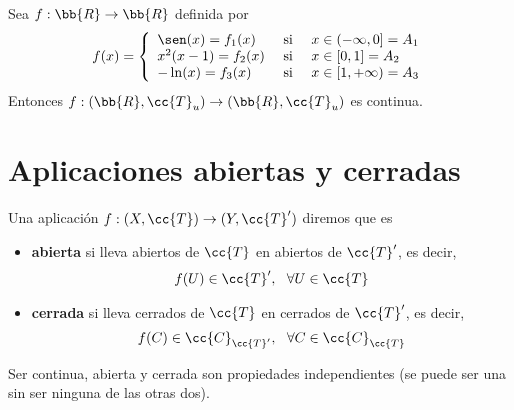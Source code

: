 \begin{ejemplo}
    Sea $f:\bb{R} \to \bb{R}$ definida por
    \begin{gather*}
        f(x)=\left\{
        \begin{array}{lcl}
            \sen(x)=f_1(x) & \text{ si } & x \in (-\infty, 0] = A_1\\
            x^2(x-1)=f_2(x) & \text{ si } & x \in [0,1] = A_2\\
            -\ln(x) = f_3(x) & \text{ si } & x \in [1, +\infty) = A_3\\
        \end{array}
        \right.
    \end{gather*}
    Entonces $f:(\bb{R}, \cc{T}_u) \to (\bb{R}, \cc{T}_u)$ es continua.
    \endsquare
\end{ejemplo}

\section{Aplicaciones abiertas y cerradas}

\begin{definicion}
    Una aplicación $f:(X, \cc{T})\to (Y, \cc{T}')$ diremos que es
    \begin{itemize}
        \item \textbf{abierta} si lleva abiertos de $\cc{T}$ en abiertos de $\cc{T}'$, es decir,
        \begin{align*}
            f(U)\in \cc{T}',\ \ \forall U \in \cc{T}
        \end{align*}
        \item \textbf{cerrada} si lleva cerrados de $\cc{T}$ en cerrados de $\cc{T}'$, es decir,
        \begin{align*}
            f(C)\in \cc{C}_{\cc{T}'},\ \ \forall C \in \cc{C}_{\cc{T}}
        \end{align*}
    \end{itemize}
    \endsquare
\end{definicion}

\begin{observacion}
    Ser continua, abierta y cerrada son propiedades independientes (se puede ser una sin ser ninguna de las otras dos).
    \endsquare
\end{observacion}


